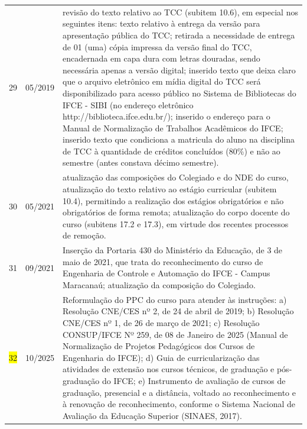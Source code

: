 \begin{center}
\begin{longtable}{lp{2cm}p{11cm}}
		29 & 05/2019 & revisão do texto relativo ao TCC (subitem 10.6), em especial nos seguintes itens: texto relativo à entrega da versão para apresentação pública do TCC; retirada a necessidade de entrega de 01 (uma) cópia impressa da versão final do TCC, encadernada em capa dura com letras douradas, sendo necessária apenas a versão digital; inserido texto que deixa claro que o arquivo eletrônico em mídia digital do TCC será disponibilizado para acesso público no Sistema de Bibliotecas do IFCE - SIBI (no endereço eletrônico http://biblioteca.ifce.edu.br/); inserido o endereço para o Manual de Normalização de Trabalhos Acadêmicos do IFCE; inserido texto que condiciona a matricula do aluno na disciplina de TCC à quantidade de créditos concluídos (80\%) e não ao semestre (antes constava décimo semestre).
		\\
		30 & 05/2021 & atualização das composições do Colegiado e do NDE do curso, atualização do texto relativo ao estágio curricular (subitem 10.4), permitindo a realização dos estágios obrigatórios e não obrigatórios de forma remota; atualização do corpo docente do curso (subitens 17.2 e 17.3), em virtude dos recentes processos de remoção.
		\\
		31 & 09/2021 & Inserção da Portaria 430 do Ministério da Educação, de 3 de maio de 2021, que trata do reconhecimento do curso de Engenharia de Controle e Automação do IFCE - Campus Maracanaú; atualização da composição do Colegiado.
		\\
		\colorbox{yellow}{32} & 10/2025 & Reformulação do PPC do curso para atender às instruções: a) Resolução CNE/CES nº 2, de 24 de abril de 2019;
		b) Resolução CNE/CES nº 1, de 26 de março de 2021; c) Resolução CONSUP/IFCE Nº 259, de 08 de Janeiro de 2025 (Manual de Normalização de Projetos Pedagógicos dos Cursos de Engenharia do IFCE); d) Guia de curricularização das atividades de extensão nos cursos técnicos, de graduação e pós-graduação do IFCE; e) Instrumento de avaliação de cursos de graduação, presencial e a distância, voltado ao reconhecimento e à renovação de reconhecimento, conforme o Sistema Nacional de Avaliação da Educação Superior (SINAES, 2017).
			
	\end{longtable}
\end{center}
